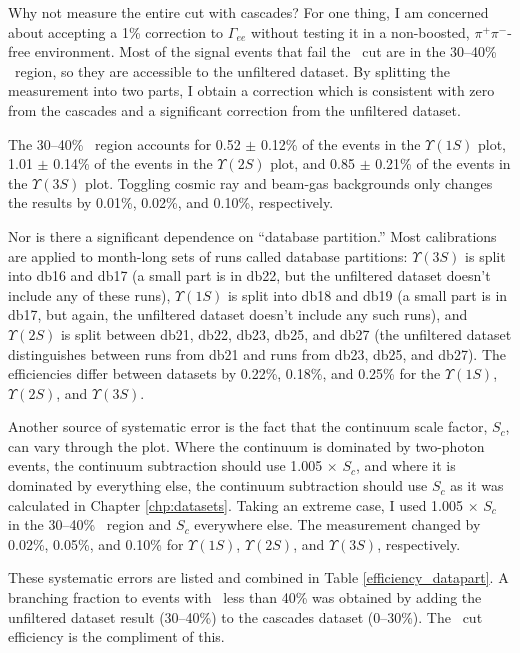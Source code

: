 Why not measure the entire cut with cascades?  For one thing, I am
concerned about accepting a 1\% correction to $\Gamma_{ee}$ without
testing it in a non-boosted, $\pi^+\pi^-$-free environment.  Most of
the signal events that fail the \visen\ cut are in the 30--40\% \ecom\
region, so they are accessible to the unfiltered dataset.  By
splitting the measurement into two parts, I obtain a correction which
is consistent with zero from the cascades and a significant correction
from the unfiltered dataset.

The 30--40\% \ecom\ region accounts for 0.52 $\pm$ 0.12\% of the
events in the $\Upsilon(1S)$ plot, 1.01 $\pm$ 0.14\% of the events in
the $\Upsilon(2S)$ plot, and 0.85 $\pm$ 0.21\% of the events in the
$\Upsilon(3S)$ plot.  Toggling cosmic ray and beam-gas backgrounds
only changes the results by 0.01\%, 0.02\%, and 0.10\%, respectively.

Nor is there a significant dependence on ``database partition.''  Most
calibrations are applied to month-long sets of runs called database
partitions: $\Upsilon(3S)$ is split into db16 and db17 (a small part
is in db22, but the unfiltered dataset doesn't include any of these
runs), $\Upsilon(1S)$ is split into db18 and db19 (a small part is in
db17, but again, the unfiltered dataset doesn't include any such
runs), and $\Upsilon(2S)$ is split between db21, db22, db23, db25, and
db27 (the unfiltered dataset distinguishes between runs from db21 and
runs from db23, db25, and db27).  The efficiencies differ between
datasets by 0.22\%, 0.18\%, and 0.25\% for the $\Upsilon(1S)$,
$\Upsilon(2S)$, and $\Upsilon(3S)$.

Another source of systematic error is the fact that the continuum
scale factor, $S_c$, can vary through the plot.  Where the continuum
is dominated by two-photon events, the continuum subtraction should
use 1.005 $\times$ $S_c$, and where it is dominated by everything
else, the continuum subtraction should use $S_c$ as it was calculated
in Chapter \ref{chp:datasets}.  Taking an extreme case, I used 1.005
$\times$ $S_c$ in the 30--40\% \ecom\ region and $S_c$ everywhere
else.  The measurement changed by 0.02\%, 0.05\%, and 0.10\% for
$\Upsilon(1S)$, $\Upsilon(2S)$, and $\Upsilon(3S)$, respectively.

These systematic errors are listed and combined in Table
\ref{efficiency_datapart}.  A branching fraction to events with
\visen\ less than 40\% was obtained by adding the unfiltered dataset
result (30--40\%) to the cascades dataset (0--30\%).  The \visen\ cut
efficiency is the compliment of this.


